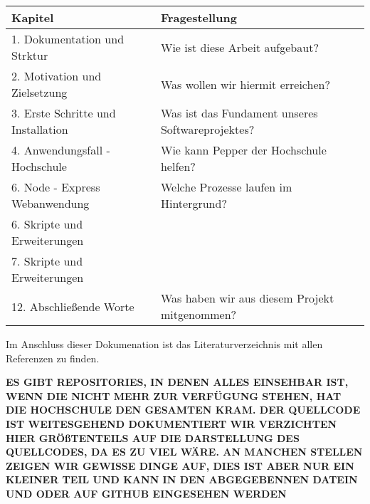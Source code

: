 \begin{table}[H]
	\centering
	\begin{tabular}{ll}
		Kapitel                            & Fragestellung                                    \\
		\midrule
		1. Dokumentation und Strktur       & Wie ist diese Arbeit aufgebaut?                  \\
		2. Motivation und Zielsetzung      & Was wollen wir hiermit erreichen?                \\
		3. Erste Schritte und Installation & Was ist das Fundament unseres Softwareprojektes? \\
		4. Anwendungsfall - Hochschule     & Wie kann Pepper der Hochschule helfen?           \\
		6. Node - Express Webanwendung     & Welche Prozesse laufen im Hintergrund?           \\
		6. Skripte und Erweiterungen       &                                                  \\
		7. Skripte und Erweiterungen       &                                                  \\
		12. Abschließende Worte            & Was haben wir aus diesem Projekt mitgenommen?    \\
		\bottomrule
	\end{tabular}
	\label{tab:logic_flow}
\end{table}

Im Anschluss dieser Dokumenation ist das Literaturverzeichnis mit allen Referenzen zu finden.


\textbf{ES GIBT REPOSITORIES, IN DENEN ALLES EINSEHBAR IST, WENN DIE NICHT MEHR ZUR VERFÜGUNG STEHEN, HAT DIE
	HOCHSCHULE DEN GESAMTEN KRAM.
	DER QUELLCODE IST WEITESGEHEND DOKUMENTIERT
	WIR VERZICHTEN HIER GRÖßTENTEILS AUF DIE DARSTELLUNG DES QUELLCODES, DA ES ZU VIEL WÄRE.
	AN MANCHEN STELLEN ZEIGEN WIR GEWISSE DINGE AUF, DIES IST ABER NUR EIN KLEINER TEIL UND KANN
	IN DEN ABGEGEBENNEN DATEIN UND ODER AUF GITHUB EINGESEHEN WERDEN
}